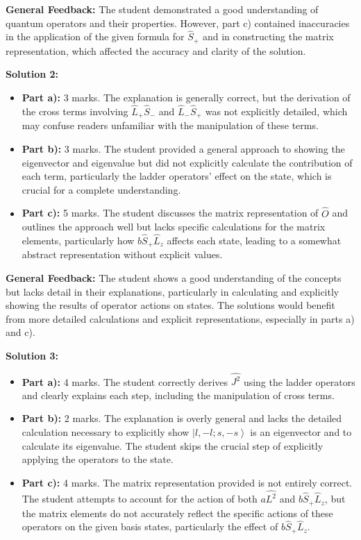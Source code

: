 \documentclass[a4paper,11pt]{article}
\begin{document}
\textbf{General Feedback:} The student demonstrated a good understanding of quantum operators and their properties. However, part c) contained inaccuracies in the application of the given formula for \( \hat{S}_{+} \) and in constructing the matrix representation, which affected the accuracy and clarity of the solution.

\textbf{Solution 2:}

\begin{itemize}
    \item \textbf{Part a):} 3 marks. The explanation is generally correct, but the derivation of the cross terms involving \( \hat{L}_{+}\hat{S}_{-} \) and \( \hat{L}_{-}\hat{S}_{+} \) was not explicitly detailed, which may confuse readers unfamiliar with the manipulation of these terms.
    \item \textbf{Part b):} 3 marks. The student provided a general approach to showing the eigenvector and eigenvalue but did not explicitly calculate the contribution of each term, particularly the ladder operators' effect on the state, which is crucial for a complete understanding.
    \item \textbf{Part c):} 5 marks. The student discusses the matrix representation of \( \hat{O} \) and outlines the approach well but lacks specific calculations for the matrix elements, particularly how \( b\hat{S}_{+}\hat{L}_{z} \) affects each state, leading to a somewhat abstract representation without explicit values.
\end{itemize}

\textbf{General Feedback:} The student shows a good understanding of the concepts but lacks detail in their explanations, particularly in calculating and explicitly showing the results of operator actions on states. The solutions would benefit from more detailed calculations and explicit representations, especially in parts a) and c).

\textbf{Solution 3:}

\begin{itemize}
    \item \textbf{Part a):} 4 marks. The student correctly derives \( \hat{J^{2}} \) using the ladder operators and clearly explains each step, including the manipulation of cross terms.
    \item \textbf{Part b):} 2 marks. The explanation is overly general and lacks the detailed calculation necessary to explicitly show \( \left|l, -l; s, -s \right> \) is an eigenvector and to calculate its eigenvalue. The student skips the crucial step of explicitly applying the operators to the state.
    \item \textbf{Part c):} 4 marks. The matrix representation provided is not entirely correct. The student attempts to account for the action of both \( a\hat{L^{2}} \) and \( b\hat{S}_{+}\hat{L}_{z} \), but the matrix elements do not accurately reflect the specific actions of these operators on the given basis states, particularly the effect of \( b\hat{S}_{+}\hat{L}_{z} \).
\end{itemize}
\end{document}

